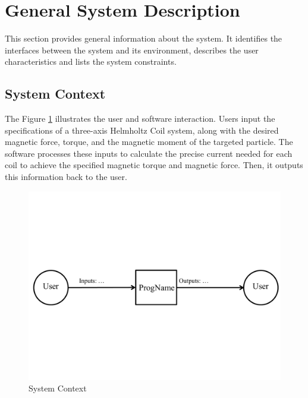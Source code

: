 \documentclass[12pt]{article}
\begin{document}
\section{General System Description}

This section provides general information about the system.  It identifies the
interfaces between the system and its environment, describes the user
characteristics and lists the system constraints.
\subsection{System Context}

{
The Figure \ref{Fig_SystemContext} illustrates the user and software interaction. Users input the specifications of a three-axis Helmholtz Coil system, along with the desired magnetic force, torque, and the magnetic moment of the targeted particle. The software processes these inputs to calculate the precise current needed for each coil to achieve the specified magnetic torque and magnetic force. Then, it outputs this information back to the user.
}

\begin{figure}[H]
\begin{center}
 \includegraphics[width=1.0\textwidth]{SystemContextFigure}
\caption{System Context}
\label{Fig_SystemContext} 
\end{center}
\end{figure}
\end{document}
